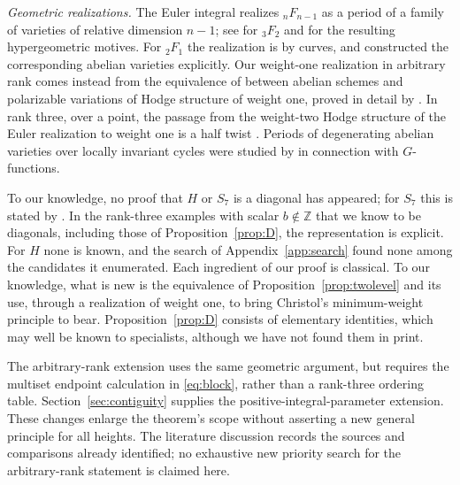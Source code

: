 \documentclass[11pt]{amsart}
\theoremstyle{definition}
\theoremstyle{remark}
\numberwithin{equation}{section}
\newcommand{\Z}{\mathbb{Z}}
\begin{document}
\emph{Geometric realizations.} The Euler integral realizes ${}_nF_{n-1}$ as a period of a family of varieties of relative dimension $n-1$; see \citet[\S4.3]{Christol2015} for ${}_3F_2$ and \citet{KellyVoight2024} for the resulting hypergeometric motives. For ${}_2F_1$ the realization is by curves, and \citet{Archinard2003} constructed the corresponding abelian varieties explicitly. Our weight-one realization in arbitrary rank comes instead from the equivalence of \citet[4.4.3]{Deligne1971} between abelian schemes and polarizable variations of Hodge structure of weight one, proved in detail by \citet[Theorem~7.13]{Milne2013}. In rank three, over a point, the passage from the weight-two Hodge structure of the Euler realization to weight one is a half twist \citep{vanGeemen2001,vanGeemenIzadi2002}. Periods of degenerating abelian varieties over locally invariant cycles were studied by \citet{Andre1989} in connection with $G$-functions.

To our knowledge, no proof that $H$ or $S_7$ is a diagonal has appeared; for $S_7$ this is stated by \citet[Remark~4.2]{HarderKramerMiller2025}. In the rank-three examples with scalar $b\notin\Z$ that we know to be diagonals, including those of Proposition~\ref{prop:D}, the representation is explicit. For $H$ none is known, and the search of Appendix~\ref{app:search} found none among the candidates it enumerated. Each ingredient of our proof is classical. To our knowledge, what is new is the equivalence of Proposition~\ref{prop:twolevel} and its use, through a realization of weight one, to bring Christol's minimum-weight principle to bear. Proposition~\ref{prop:D} consists of elementary identities, which may well be known to specialists, although we have not found them in print.

The arbitrary-rank extension uses the same geometric argument, but requires the multiset endpoint calculation in \eqref{eq:block}, rather than a rank-three ordering table. Section~\ref{sec:contiguity} supplies the positive-integral-parameter extension. These changes enlarge the theorem's scope without asserting a new general principle for all heights. The literature discussion records the sources and comparisons already identified; no exhaustive new priority search for the arbitrary-rank statement is claimed here.
\end{document}
